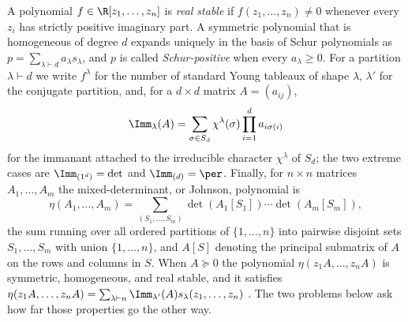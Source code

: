 A polynomial $f\in\R[z_1,\ldots,z_n]$ is \emph{real stable} if $f(z_1,\ldots,z_n)\ne0$ whenever every $z_i$ has strictly positive imaginary part.  A symmetric polynomial that is homogeneous of degree $d$ expands uniquely in the basis of Schur polynomials as $p=\sum_{\lambda\vdash d}a_\lambda s_\lambda$, and $p$ is called \emph{Schur-positive} when every $a_\lambda\ge0$.  For a partition $\lambda\vdash d$ we write $f^\lambda$ for the number of standard Young tableaux of shape $\lambda$, $\lambda'$ for the conjugate partition, and, for a $d\times d$ matrix $A=(a_{ij})$,
\[
\Imm_\lambda(A)=\sum_{\sigma\in S_d}\chi^\lambda(\sigma)\prod_{i=1}^da_{i\sigma(i)}
\]
for the immanant attached to the irreducible character $\chi^\lambda$ of $S_d$; the two extreme cases are $\Imm_{(1^d)}=\det$ and $\Imm_{(d)}=\per$.  Finally, for $n\times n$ matrices $A_1,\ldots,A_m$ the mixed-determinant, or Johnson, polynomial is
\[
\eta(A_1,\ldots,A_m)=\sum_{(S_1,\ldots,S_m)}\det(A_1[S_1])\cdots\det(A_m[S_m]),
\]
the sum running over all ordered partitions of $\{1,\ldots,n\}$ into pairwise disjoint sets $S_1,\ldots,S_m$ with union $\{1,\ldots,n\}$, and $A[S]$ denoting the principal submatrix of $A$ on the rows and columns in $S$.  When $A\succeq0$ the polynomial $\eta(z_1A,\ldots,z_nA)$ is symmetric, homogeneous, and real stable, and it satisfies $\eta(z_1A,\ldots,z_nA)=\sum_{\lambda\vdash n}\Imm_{\lambda'}(A)s_\lambda(z_1,\ldots,z_n)$ \cite{AIMStableProblems}.  The two problems below ask how far those properties go the other way.
